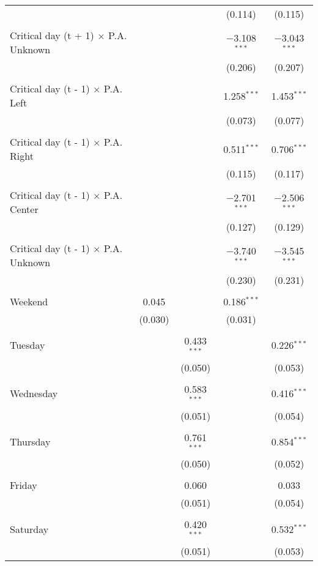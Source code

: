 \documentclass[
]{article}
\begin{document}
\begin{table}[!htbp]
{\begin{tabular}{@{\extracolsep{5pt}}lcccc}
  &  &  & (0.114) & (0.115) \\ 
  & & & & \\ 
 Critical day (t + 1) $\times$ P.A. Unknown &  &  & $-$3.108$^{***}$ & $-$3.043$^{***}$ \\ 
  &  &  & (0.206) & (0.207) \\ 
  & & & & \\ 
 Critical day (t - 1) $\times$ P.A. Left &  &  & 1.258$^{***}$ & 1.453$^{***}$ \\ 
  &  &  & (0.073) & (0.077) \\ 
  & & & & \\ 
 Critical day (t - 1) $\times$ P.A. Right &  &  & 0.511$^{***}$ & 0.706$^{***}$ \\ 
  &  &  & (0.115) & (0.117) \\ 
  & & & & \\ 
 Critical day (t - 1) $\times$ P.A. Center &  &  & $-$2.701$^{***}$ & $-$2.506$^{***}$ \\ 
  &  &  & (0.127) & (0.129) \\ 
  & & & & \\ 
 Critical day (t - 1) $\times$ P.A. Unknown &  &  & $-$3.740$^{***}$ & $-$3.545$^{***}$ \\ 
  &  &  & (0.230) & (0.231) \\ 
  & & & & \\ 
 Weekend & 0.045 &  & 0.186$^{***}$ &  \\ 
  & (0.030) &  & (0.031) &  \\ 
  & & & & \\ 
 Tuesday &  & 0.433$^{***}$ &  & 0.226$^{***}$ \\ 
  &  & (0.050) &  & (0.053) \\ 
  & & & & \\ 
 Wednesday &  & 0.583$^{***}$ &  & 0.416$^{***}$ \\ 
  &  & (0.051) &  & (0.054) \\ 
  & & & & \\ 
 Thursday &  & 0.761$^{***}$ &  & 0.854$^{***}$ \\ 
  &  & (0.050) &  & (0.052) \\ 
  & & & & \\ 
 Friday &  & 0.060 &  & 0.033 \\ 
  &  & (0.051) &  & (0.054) \\ 
  & & & & \\ 
 Saturday &  & 0.420$^{***}$ &  & 0.532$^{***}$ \\ 
  &  & (0.051) &  & (0.053) \\ 

\end{tabular}}
\end{table}
\end{document}
